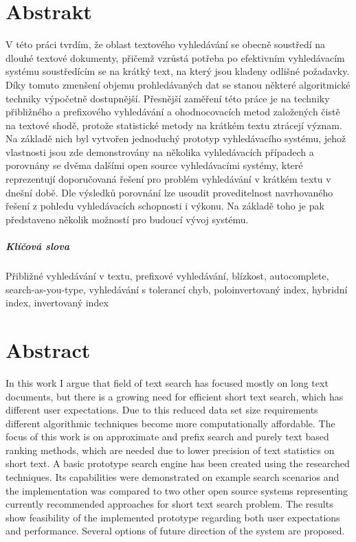 \documentclass[11pt,letterpaper,oneside,openright]{book}
\begin{document}
\newpage
\chapter*{Abstrakt}
V této práci tvrdím, že oblast textového vyhledávání se obecně soustředí na
dlouhé textové dokumenty, přičemž vzrůstá potřeba po efektivním vyhledávacím
systému soustředícím se na krátký text, na který jsou kladeny odlišné
požadavky. Díky tomuto zmenšení objemu prohledávaných dat se stanou některé
algoritmické techniky výpočetně dostupnější. Přesnější zaměření této práce je
na techniky přibližného a prefixového vyhledávání a ohodnocovacích metod
založených čistě na textové shodě, protože statistické metody na krátkém textu
ztrácejí význam. Na základě nich byl vytvořen jednoduchý prototyp vyhledávacího
systému, jehož vlastnosti jsou zde demonstrovány na několika vyhledávacích
případech a porovnány se dvěma dalšími open source vyhledávacími systémy, které
reprezentují doporučovaná řešení pro problém vyhledávání v krátkém textu v
dnešní době. Dle výsledků porovnání lze usoudit proveditelnost navrhovaného
řešení z pohledu vyhledávacích schopnosti i výkonu. Na základě toho je pak
představeno několik možností pro budoucí vývoj systému.

\paragraph{Klíčová slova}
Přibližné vyhledávání v textu, prefixové vyhledávání, blízkost, autocomplete,
search-as-you-type, vyhledávání s tolerancí chyb, poloinvertovaný index,
hybridní index, invertovaný index

\newpage
\chapter*{Abstract}
In this work I argue that field of text search has focused mostly on long text
documents, but there is a growing need for efficient short text search, which
has different user expectations. Due to this reduced data set size requirements
different algorithmic techniques become more computationally affordable. The
focus of this work is on approximate and prefix search and purely text based
ranking methods, which are needed due to lower precision of text statistics on
short text. A basic prototype search engine has been created using the
researched techniques. Its capabilities were demonstrated on example search
scenarios and the implementation was compared to two other open source systems
representing currently recommended approaches for short text search problem.
The results show feasibility of the implemented prototype regarding both user
expectations and performance. Several options of future direction of the system
are proposed.
\end{document}
